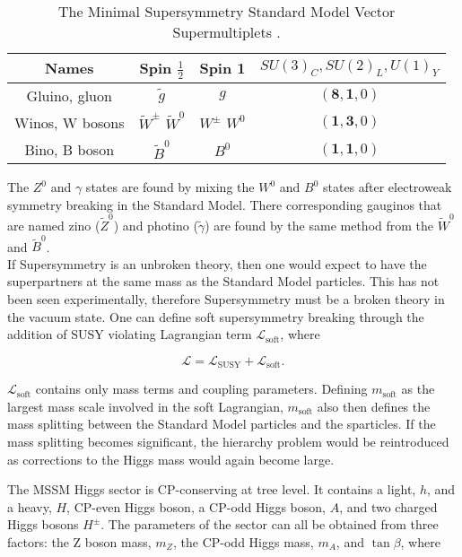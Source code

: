 \begin{table}[H]
\centering
\begin{tabular}{c||ccc}
     \hline
     Names & Spin \(\frac{1}{2}\) & Spin 1 & \(SU(3)_C, SU(2)_L, U(1)_Y \)\\
     \hline
     \hline
     Gluino, gluon & \(\tilde{g}\) & \(g\) & \((\textbf{8},\textbf{1},0)\) \\
     Winos, W bosons & \(\tilde{W}^{\pm}\) \(\tilde{W}^{0}\) & \(W^{\pm}\) \(W^0\) & \((\textbf{1},\textbf{3},0)\) \\
     Bino, B boson & \(\tilde{B}^{0}\) & \(B^0\) & \((\textbf{1},\textbf{1},0)\) \\
     \hline
\end{tabular}
\caption{The Minimal Supersymmetry Standard Model Vector Supermultiplets \cite{SUSY_Primer}.}
\label{tab:MSSM_vector}
\end{table}


The \(Z^{0}\) and \(\gamma\) states are found by mixing the \(W^0\) and \(B^0\) states after electroweak symmetry breaking in the Standard Model. There corresponding gauginos that are named zino (\(\tilde{Z}^0\)) and photino (\(\tilde{\gamma}\)) are found by the same method from the \(\tilde{W}^0\) and \(\tilde{B}^0\). \\

If Supersymmetry is an unbroken theory, then one would expect to have the superpartners at the same mass as the Standard Model particles. This has not been seen experimentally, therefore Supersymmetry must be a broken theory in the vacuum state. One can define soft supersymmetry breaking through the addition of SUSY violating Lagrangian term \(\mathcal{L}_{\text{soft}}\), where

\begin{equation}
    \mathcal{L} = \mathcal{L}_{\text{SUSY}} + \mathcal{L}_{\text{soft}}.
\end{equation}

\(\mathcal{L}_{\text{soft}}\) contains only mass terms and coupling parameters. Defining \(m_{\text{soft}}\) as the largest mass scale involved in the soft Lagrangian, \(m_{\text{soft}}\) also then defines the mass splitting between the Standard Model particles and the sparticles. If the mass splitting becomes significant, the hierarchy problem would be reintroduced as corrections to the Higgs mass would again become large.

The MSSM Higgs sector is CP-conserving at tree level. It contains a light, \(h\), and a heavy, \(H\), CP-even Higgs boson, a CP-odd Higgs boson, \(A\), and two charged Higgs bosons \(H^{\pm}\). The parameters of the sector can all be obtained from three factors: the Z boson mass, \(m_Z\), the CP-odd Higgs mass, \(m_A\), and \(\tan\beta\), where

